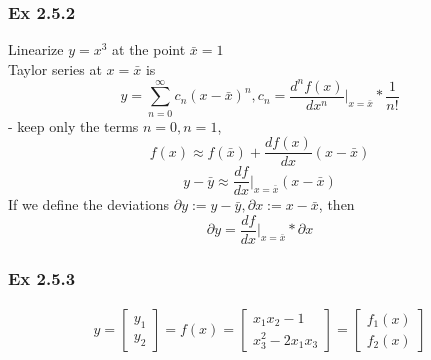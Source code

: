 \documentclass[letterpaper]{article}
\begin{document}
\subsubsection{Ex 2.5.2}
Linearize $y=x^3$ at the point $\bar x=1$\\
Taylor series at $x=\bar x$ is $$y=\sum_{n=0}^{\infty} c_n(x-\bar x)^n,c_n=\frac{d^nf(x)}{dx^n}\vert_{x=\bar x}* \frac{1}{n!}$$
- keep only the terms $n=0,n=1$, $$f(x)\approx f(\bar x)+\frac{df(x)}{dx}(x-\bar x)$$
$$y-\bar y\approx \frac{df}{dx}\vert_{x=\bar x}(x-\bar x)$$
If we define the deviations $\partial y:=y-\bar y, \partial x:=x-\bar x$, then $$\partial y=\frac{df}{dx}\vert_{x=\bar x}*\partial x$$ 

\subsubsection*{Ex 2.5.3}
\begin{align*}
	y=\begin{bmatrix} y_1 \\y_2\end{bmatrix}=f(x)=\begin{bmatrix}x_1x_2-1\\x_3^2-2x_1x_3\end{bmatrix}=\begin{bmatrix} f_1(x)\\f_2(x)\end{bmatrix}
\end{align*}
\end{document}
